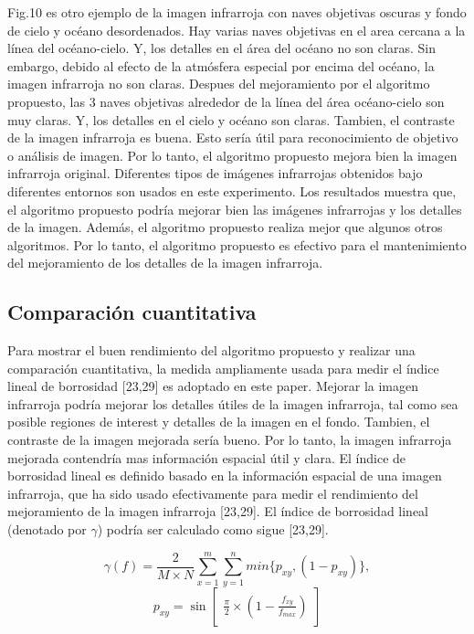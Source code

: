 \documentclass[a4paper, 11 pt, conference]{ieeeconf}      %
\begin{document}
Fig.10 es otro ejemplo de la imagen infrarroja con naves objetivas oscuras y fondo de cielo y oc\'eano desordenados. Hay varias naves objetivas en el area cercana a la l\'inea del oc\'eano-cielo. Y, los detalles en el \'area del oc\'eano no son claras. Sin embargo, debido al efecto de la atm\'osfera especial por encima del oc\'eano, la imagen infrarroja no son claras. Despues del mejoramiento por el algoritmo propuesto, las 3 naves objetivas alrededor de la l\'inea del \'area oc\'eano-cielo son muy claras. Y, los detalles en el cielo y oc\'eano son claras. Tambien, el contraste de la imagen infrarroja es buena.
Esto ser\'ia \'util para reconocimiento de objetivo o an\'alisis de imagen. Por lo tanto, el algoritmo propuesto mejora bien la imagen infrarroja original.
Diferentes tipos de im\'agenes infrarrojas obtenidos bajo diferentes entornos son usados en este experimento. Los resultados muestra que, el algoritmo propuesto podr\'ia mejorar bien las im\'agenes infrarrojas y los detalles de la imagen. Adem\'as, el algoritmo propuesto realiza mejor que algunos otros algoritmos. Por lo tanto, el algoritmo propuesto es efectivo para el mantenimiento del mejoramiento de los detalles de la imagen infrarroja.
\subsection{Comparaci\'on cuantitativa}
Para mostrar el buen rendimiento del algoritmo propuesto y realizar una comparaci\'on cuantitativa, la medida ampliamente usada para medir el \'indice lineal de borrosidad [23,29] es adoptado en este paper. Mejorar la imagen infrarroja podr\'ia mejorar los detalles \'utiles de la imagen infrarroja, tal como sea posible regiones de interest y detalles de la imagen en el fondo. Tambien, el contraste de la imagen mejorada ser\'ia bueno. Por lo tanto, la imagen infrarroja mejorada contendr\'ia mas informaci\'on espacial \'util y clara. El \'indice de borrosidad lineal es definido basado en la informaci\'on espacial de una imagen infrarroja, que ha sido usado efectivamente para medir el rendimiento del mejoramiento de la imagen infrarroja [23,29]. El \'indice de borrosidad lineal (denotado por $\gamma$) podr\'ia ser calculado como sigue [23,29].

$$
\gamma(f) = \frac{2}{M \times N}\displaystyle\sum_{x=1}^{m}\sum_{y=1}^{n}min\{p_{xy},(1-p_{xy})\},
$$
$$
p_{xy} = \sin 
 \begin{bmatrix}
    \frac{\pi}{2} \times (1 - \frac{f_{xy}}{f_{max}})
 \end{bmatrix}
$$
\end{document}
